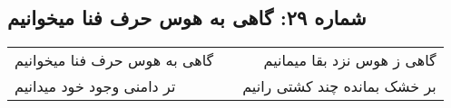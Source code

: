 \begin{center}
\section*{شماره ۲۹: گاهی به هوس حرف فنا میخوانیم}
\label{sec:029}
\begin{longtable}{l p{0.5cm} r}
گاهی به هوس حرف فنا میخوانیم
&&
گاهی ز هوس نزد بقا میمانیم
\\
تر دامنی وجود خود میدانیم
&&
بر خشک بمانده چند کشتی رانیم
\\
\end{longtable}
\end{center}

